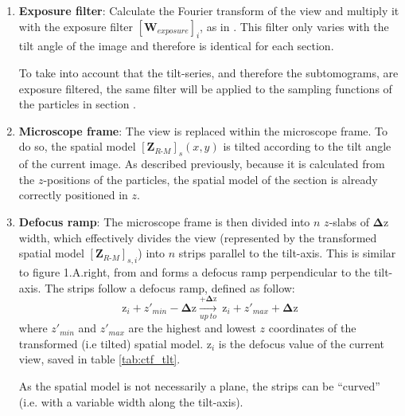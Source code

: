 \begin{enumerate}
    \item \textbf{Exposure filter}: Calculate the Fourier transform of the view and multiply it with the exposure filter ${[\bm{W}_{exposure}]}_i$, as in \cite{exposure_grant_2015}. This filter only varies with the tilt angle of the image and therefore is identical for each section.
    \begin{note}To take into account that the tilt-series, and therefore the subtomograms, are exposure filtered, the same filter will be applied to the sampling functions of the particles in section .
    \end{note}
    
    \item \textbf{Microscope frame}: The view is replaced within the microscope frame. To do so, the spatial model ${[\bm{Z}_{R\text{-}M}]}_s(x,y)$ is tilted according to the tilt angle of the current image. As described previously, because it is calculated from the $z$-positions of the particles, the spatial model of the section is already correctly positioned in $z$.
    
    \item \textbf{Defocus ramp}: The microscope frame is then divided into $n$ $z$-slabs of $\bm{\Delta \mathrm{z}}$ width, which effectively divides the view (represented by the transformed spatial model ${[\bm{Z}_{R\text{-}M}]}_{s,i}$) into $n$ strips parallel to the tilt-axis. This is similar to figure 1.A.right, from \cite{novaCTF} and forms a defocus ramp perpendicular to the tilt-axis. The strips follow a defocus ramp, defined as follow:
    \begin{equation} \label{eq:def_ramp}
        \bm{\mathrm{z}}_{i} + {z'}_{min} - \bm{\Delta \mathrm{z}}
                                  \xrightarrow[up\ to]{+\bm{\Delta \mathrm{z}}}\
                                  \bm{\mathrm{z}}_{i} + {z'}_{max} + \bm{\Delta \mathrm{z}}
    \end{equation}
    where ${z'}_{min}$ and ${z'}_{max}$ are the highest and lowest $z$ coordinates of the transformed (i.e tilted) spatial model. $\bm{\mathrm{z}}_{i}$ is the defocus value of the current view, saved in table \ref{tab:ctf_tlt}.
    
    \begin{note}As the spatial model is not necessarily a plane, the strips can be ``curved'' (i.e. with a variable width along the tilt-axis).
    \end{note}
    

\end{enumerate}

